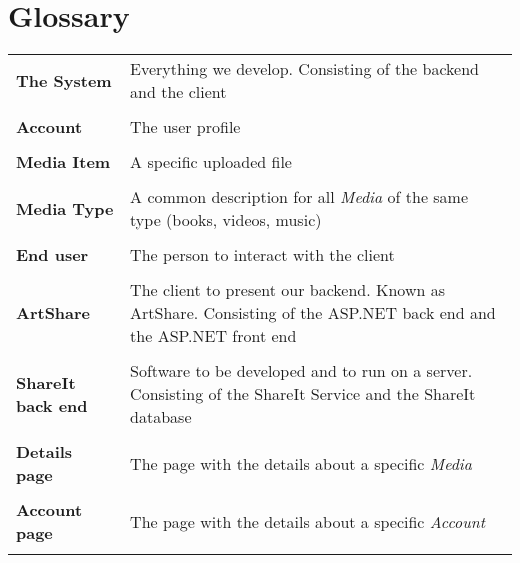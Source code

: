 \documentclass[../report.tex]{subfiles}
\begin{document}
\section{Glossary}
\begin{tabular}{l p{10 cm}}
\textbf{The System} & Everything we develop. Consisting of the backend and the client \\ \\
\textbf{Account} & The user profile \\ \\
\textbf{Media Item} & A specific uploaded file \\ \\
\textbf{Media Type} & A common description for all \textit{Media} of the same type (books, videos, music) \\ \\
\textbf{End user} & The person to interact with the client \\ \\
\textbf{ArtShare} & The client to present our backend. Known as ArtShare. Consisting of the ASP.NET back end and the ASP.NET front end \\ \\
\textbf{ShareIt back end} & Software to be developed and to run on a server. Consisting of the ShareIt Service and the ShareIt database \\ \\
\textbf{Details page} & The page with the details about a specific \textit{Media} \\ \\
\textbf{Account page} & The page with the details about a specific \textit{Account} \\ \\
\end{tabular}
\end{document}
